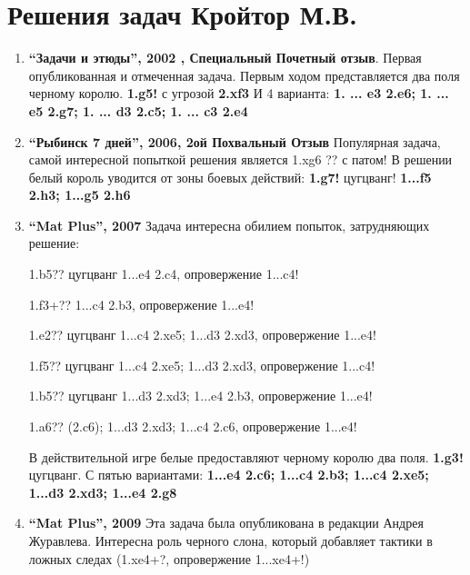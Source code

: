 \section{Решения задач Кройтор М.В.}

\begin{enumerate}
\item \textbf{``Задачи и этюды'', 2002	, Специальный Почетный отзыв}. Первая опубликованная и отмеченная задача. Первым ходом представляется два поля черному королю. \textbf{1.\knight{}g5!} с угрозой \textbf{2.\knight{}xf3\mate{}} И 4 варианта: \textbf{1. ... \king{}e3 2.\knight{}e6\mate{}; 1. ... \king{}e5 2.\bishop{}g7\mate{}; 1. ... \rook{}d3 2.\queen{}c5\mate{}; 1. ... \bishop{}c3 2.\queen{}e4\mate{}}

\item \textbf{ ``Рыбинск 7 дней'', 2006, 2ой Похвальный Отзыв } Популярная задача, самой интересной попыткой решения является 1.\king{}xg6 ?? с патом! В решении белый король уводится от зоны боевых действий:
\textbf{1.\king{}g7!} цугцванг! \textbf{1...\king{}f5 2.\queen{}h3\mate{}; 1...g5 2.\knight{}h6\mate{}}
   
\item \textbf{ ``Mat Plus'', 2007 } Задача интересна обилием попыток, затрудняющих решение: 

1.\bishop{}b5?? цугцванг 1...e4 2.\queen{}c4\mate{}, опровержение 1...c4!

1.\queen{}f3+?? 1...\king{}c4 2.\queen{}b3\mate{}, опровержение 1...e4!

1.\queen{}e2?? цугцванг 1...c4 2.\queen{}xe5\mate{};  1...d3 2.\queen{}xd3\mate{}, опровержение 1...e4!

1.\queen{}f5?? цугцванг  1...c4 2.\queen{}xe5\mate{};  1...d3 2.\queen{}xd3\mate{}, опровержение 1...\king{}c4!

1.\queen{}b5?? цугцванг 1...d3 2.\queen{}xd3\mate{};  1...e4 2.\bishop{}b3\mate{}, опровержение 1...\queen{}e4!

1.\queen{}a6?? (2.\bishop{}c6\mate{}); 1...d3 2.\queen{}xd3\mate{};  1...c4 2.\queen{}c6\mate{}, опровержение  1...\king{}e4!

В действительной игре белые предоставляют черному королю два поля. \textbf{1.\queen{}g3!} цугцванг. С пятью вариантами: \textbf{1...\king{}e4 2.\bishop{}c6\mate{}; 1...\king{}c4 2.\queen{}b3\mate{}; 1...c4 2.\queen{}xe5\mate{}; 1...d3 2.\queen{}xd3\mate{};  1...e4 2.\queen{}g8\mate{}}
   
\item \textbf{ ``Mat Plus'', 2009 } Эта задача была опубликована в редакции Андрея Журавлева. Интересна роль черного слона, который добавляет тактики в ложных следах (1.\rook{}xe4+?, опровержение  1...\king{}xe4+!)


\end{enumerate}
